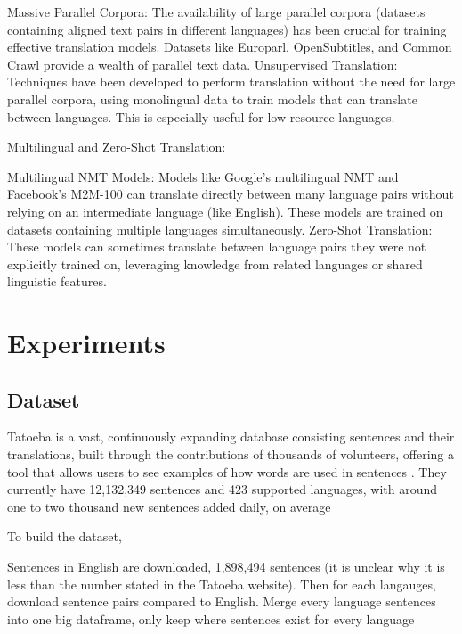 \documentclass[a4paper]{article}
\begin{document}
Massive Parallel Corpora: The availability of large parallel corpora (datasets containing aligned text pairs in different languages) has been crucial for training effective translation models. Datasets like Europarl, OpenSubtitles, and Common Crawl provide a wealth of parallel text data.
Unsupervised Translation: Techniques have been developed to perform translation without the need for large parallel corpora, using monolingual data to train models that can translate between languages. This is especially useful for low-resource languages.

Multilingual and Zero-Shot Translation:

Multilingual NMT Models: Models like Google's multilingual NMT and Facebook's M2M-100 can translate directly between many language pairs without relying on an intermediate language (like English). These models are trained on datasets containing multiple languages simultaneously.
Zero-Shot Translation: These models can sometimes translate between language pairs they were not explicitly trained on, leveraging knowledge from related languages or shared linguistic features.

\section{Experiments}

\subsection{Dataset}

Tatoeba is a vast, continuously expanding database consisting sentences and their translations, built through the contributions of thousands of volunteers, offering a tool that allows users to see examples of how words are used in sentences \cite{tatoeba}. They currently have 12,132,349 sentences and 423 supported languages, with around one to two thousand new sentences added daily, on average

To build the dataset,

Sentences in English are downloaded, 1,898,494 sentences (it is unclear why it is less than the number stated in the Tatoeba website). Then for each langauges, download sentence pairs compared to English. Merge every language sentences into one big dataframe, only keep where sentences exist for every language
\end{document}

